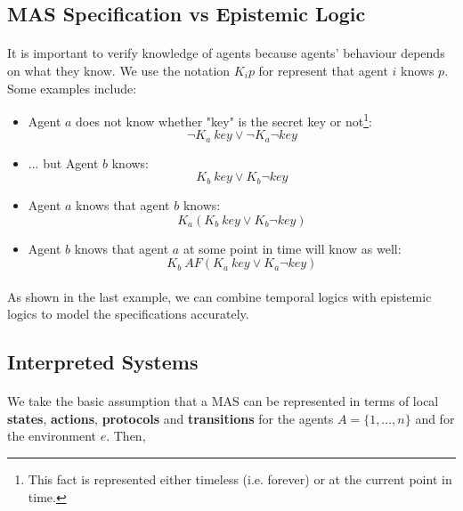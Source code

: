 \documentclass{article}
\theoremstyle{plain}
\theoremstyle{definition}
\begin{document}
\begin{multicols}{2}
\subsection{MAS Specification vs Epistemic Logic}

\paragraph{} It is important to verify knowledge of agents because agents' behaviour depends on what they know. We use the notation $K_i p$ for represent that agent $i$ knows $p$. Some examples include:

\begin{itemize}
\item Agent $a$ does not know whether "key" is the secret key or not\footnote{This fact is represented either timeless (i.e. forever) or at the current point in time.}: $$\lnot K_a\ key \lor \lnot K_a \lnot key$$
\item ... but Agent $b$ knows: $$K_b\ key \lor K_b \lnot key$$
\item Agent $a$ knows that agent $b$ knows: $$K_a(K_b\ key \lor K_b \lnot key)$$
\item Agent $b$ knows that agent $a$ at some point in time will know as well: $$K_b\ AF(K_a\ key \lor K_a \lnot key)$$
\end{itemize}

\paragraph{} As shown in the last example, we can combine temporal logics with epistemic logics to model the specifications accurately.

\subsection{Interpreted Systems}

\paragraph{} We take the basic assumption that a MAS can be represented in terms of local \textbf{states}, \textbf{actions}, \textbf{protocols} and \textbf{transitions} for the agents $A = \{1, ..., n\}$ and for the environment $e$. Then,


\end{multicols}
\end{document}
